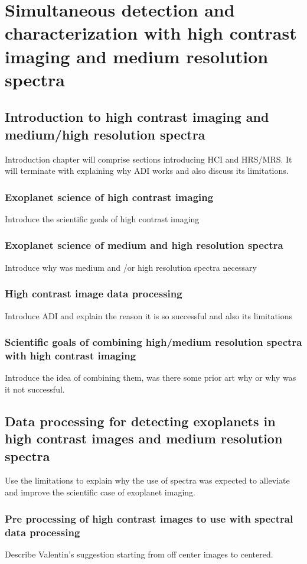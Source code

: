 \part{Simultaneous detection and characterization with high contrast imaging and medium resolution spectra}
\startcontents[chapters]
\printmyminitoc{
}



\chapter{Introduction to high contrast imaging and medium/high resolution spectra}
Introduction chapter will comprise sections introducing HCI and HRS/MRS. 
It will terminate with explaining why ADI works and also discuss its limitations.
\section{Exoplanet science of high contrast imaging}
Introduce the scientific goals of high contrast imaging
\section{Exoplanet science of medium and high resolution spectra }
Introduce why was medium and /or high resolution spectra necessary
\section{High contrast image data processing}
Introduce ADI and explain the reason it is so successful and also its limitations
\section{Scientific goals of combining high/medium resolution spectra with high contrast imaging}
Introduce the idea of combining them, was there some prior art why or why was it not successful.
\chapter{Data processing for detecting exoplanets in high contrast images and medium resolution spectra}
Use the limitations to explain why the use of spectra was expected to alleviate and improve the scientific case of exoplanet imaging. 
\section{Pre processing of high contrast images to use with spectral data processing}
Describe Valentin's suggestion starting from off center images to centered.
